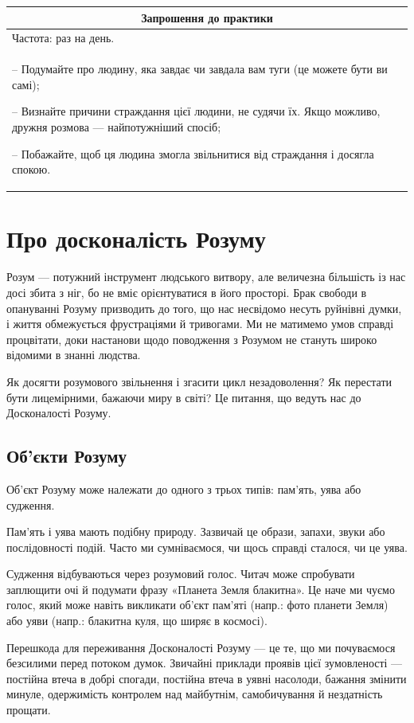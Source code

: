 \documentclass[oneside, 12pt]{book}
\newenvironment{prat}[1]
{\begin{center}
\begin{tabular}{p{0.9\textwidth}}
\hline\hline
\multicolumn{1}{c}{Запрошення до практики}\\
\hline
Частота: #1.\\
\hline
}{\\
\hline\hline
\end{tabular} 
\end{center}}
\begin{document}
\begin{prat}{раз на день}
-- Подумайте про людину, яка завдає чи завдала вам туги (це можете бути ви самі);

-- Визнайте причини страждання цієї людини, не судячи їх. Якщо можливо, дружня розмова --- найпотужніший спосіб;

-- Побажайте, щоб ця людина змогла звільнитися від страждання і досягла спокою.
\end{prat}

\chapter*{Про досконалість Розуму}

Розум --- потужний інструмент людського витвору, але величезна більшість із нас досі збита з ніг, бо не вміє орієнтуватися в його просторі. Брак свободи в опануванні Розуму призводить до того, що нас несвідомо несуть руйнівні думки, і життя обмежується фрустраціями й тривогами. Ми не матимемо умов справді процвітати, доки настанови щодо поводження з Розумом не стануть широко відомими в знанні людства.

Як досягти розумового звільнення і згасити цикл незадоволення? Як перестати бути лицемірними, бажаючи миру в світі? Це питання, що ведуть нас до Досконалості Розуму.

\section*{Об'єкти Розуму}

Об'єкт Розуму може належати до одного з трьох типів: пам'ять, уява або судження.

Пам'ять і уява мають подібну природу. Зазвичай це образи, запахи, звуки або послідовності подій. Часто ми сумніваємося, чи щось справді сталося, чи це уява.

Судження відбуваються через розумовий голос. Читач може спробувати заплющити очі й подумати фразу «Планета Земля блакитна». Це наче ми чуємо голос, який може навіть викликати об'єкт пам'яті (напр.: фото планети Земля) або уяви (напр.: блакитна куля, що ширяє в космосі).

Перешкода для переживання Досконалості Розуму --- це те, що ми почуваємося безсилими перед потоком думок. Звичайні приклади проявів цієї зумовленості --- постійна втеча в добрі спогади, постійна втеча в уявні насолоди, бажання змінити минуле, одержимість контролем над майбутнім, самобичування й нездатність прощати.
\end{document}
